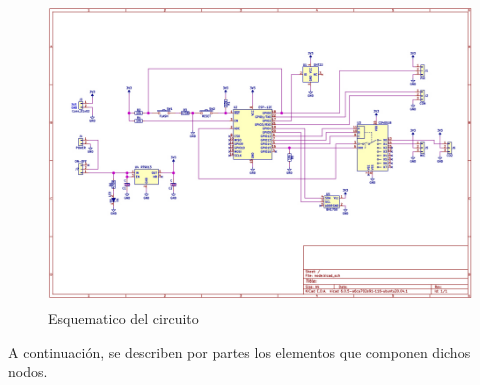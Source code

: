 \begin{figure}[H]
    \centering
    \includegraphics[width=12cm, height=8cm]{imagenes/esquematico nodo.jpg}
    \caption{Esquematico del circuito}
    \label{imag:esquematico_nodo}
\end{figure}

A continuación, se describen por partes los elementos que componen dichos nodos.


    
    



